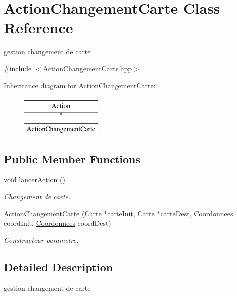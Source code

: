 \hypertarget{classActionChangementCarte}{\section{Action\-Changement\-Carte Class Reference}
\label{classActionChangementCarte}
}


gestion changement de carte  




{\ttfamily \#include $<$Action\-Changement\-Carte.\-hpp$>$}

Inheritance diagram for Action\-Changement\-Carte\-:\begin{figure}[H]
\begin{center}
\leavevmode
\includegraphics[height=2.000000cm]{classActionChangementCarte}
\end{center}
\end{figure}
\subsection*{Public Member Functions}
\begin{DoxyCompactItemize}
\item 
void \hyperlink{classActionChangementCarte_ac494368d1a8f41259761071bc27575e9}{lancer\-Action} ()
\begin{DoxyCompactList}\small\item\em Changement de carte. \end{DoxyCompactList}\item 
\hyperlink{classActionChangementCarte_ab576a1fe1f67249edfa612bde21c4a91}{Action\-Changement\-Carte} (\hyperlink{classCarte}{Carte} $\ast$carte\-Init, \hyperlink{classCarte}{Carte} $\ast$carte\-Dest, \hyperlink{classCoordonnees}{Coordonnees} coord\-Init, \hyperlink{classCoordonnees}{Coordonnees} coord\-Dest)
\begin{DoxyCompactList}\small\item\em Constructeur parametre. \end{DoxyCompactList}\end{DoxyCompactItemize}


\subsection{Detailed Description}
gestion changement de carte 

